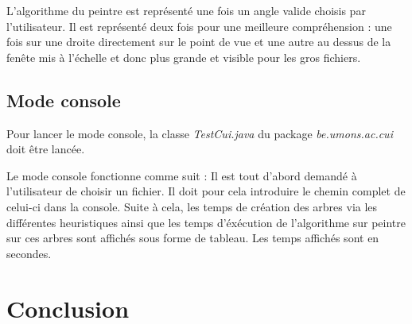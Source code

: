 \documentclass[11pt,a4paper]{article}
\theoremstyle{definition}
\theoremstyle{remark}
\begin{document}
L'algorithme du peintre est représenté une fois un angle valide choisis par l'utilisateur. Il est représenté deux fois pour une meilleure compréhension : une fois sur une droite directement sur le point de vue et une autre au dessus de la fenête mis à l'échelle et donc plus grande et visible pour les gros fichiers.

\subsection{Mode console}

Pour lancer le mode console, la classe \textit{TestCui.java} du package \textit{be.umons.ac.cui} doit être lancée.

Le mode console fonctionne comme suit :
Il est tout d'abord demandé à l'utilisateur de choisir un fichier. Il doit pour cela introduire le chemin complet de celui-ci dans la console. Suite à cela, les temps de création des arbres via les différentes heuristiques ainsi que les temps d'éxécution de l'algorithme sur peintre sur ces arbres sont affichés sous forme de tableau. Les temps affichés sont en secondes. 

\section*{Conclusion}

\end{document}

